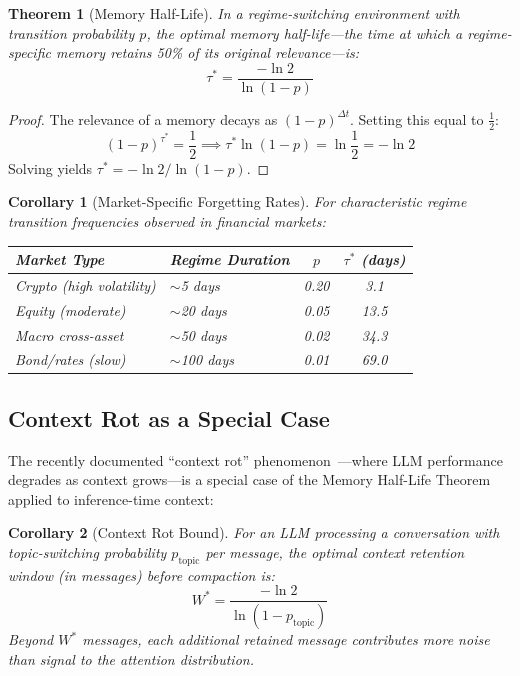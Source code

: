 \documentclass[11pt, a4paper]{article}
\newtheorem{theorem}{Theorem}
\newtheorem{corollary}{Corollary}
\begin{document}
\begin{theorem}[Memory Half-Life]
\label{thm:halflife}
In a regime-switching environment with transition probability $p$, the optimal memory half-life---the time at which a regime-specific memory retains 50\% of its original relevance---is:
\begin{equation}
  \tau^* = \frac{-\ln 2}{\ln(1-p)}
\end{equation}
\end{theorem}

\begin{proof}
The relevance of a memory decays as $(1-p)^{\Delta t}$. Setting this equal to $\frac{1}{2}$:
\begin{equation}
  (1-p)^{\tau^*} = \frac{1}{2} \implies \tau^* \ln(1-p) = \ln \frac{1}{2} = -\ln 2
\end{equation}
Solving yields $\tau^* = -\ln 2 / \ln(1-p)$.
\end{proof}

\begin{corollary}[Market-Specific Forgetting Rates]
For characteristic regime transition frequencies observed in financial markets:
\begin{center}
\small
\begin{tabular}{llcc}
\toprule
\textbf{Market Type} & \textbf{Regime Duration} & $p$ & $\tau^*$ (days) \\
\midrule
Crypto (high volatility) & $\sim$5 days & 0.20 & 3.1 \\
Equity (moderate) & $\sim$20 days & 0.05 & 13.5 \\
Macro cross-asset & $\sim$50 days & 0.02 & 34.3 \\
Bond/rates (slow) & $\sim$100 days & 0.01 & 69.0 \\
\bottomrule
\end{tabular}
\end{center}
\end{corollary}

\subsection{Context Rot as a Special Case}

The recently documented ``context rot'' phenomenon~\cite{hong2025contextrot, anthropic2025context}---where LLM performance degrades as context grows---is a special case of the Memory Half-Life Theorem applied to inference-time context:

\begin{corollary}[Context Rot Bound]
\label{cor:contextrot}
For an LLM processing a conversation with topic-switching probability $p_{\text{topic}}$ per message, the optimal context retention window (in messages) before compaction is:
\begin{equation}
  W^* = \frac{-\ln 2}{\ln(1-p_{\text{topic}})}
\end{equation}
Beyond $W^*$ messages, each additional retained message contributes more noise than signal to the attention distribution.
\end{corollary}
\end{document}
